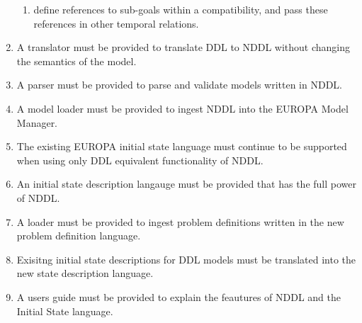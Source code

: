 \documentclass[twoside, 11pt]{article}
\begin{document}
\begin{enumerate}
\begin{enumerate}
\item define references to sub-goals within a compatibility, and pass these references in other temporal relations.
\end{enumerate}
\item A translator must be provided to translate DDL to NDDL without changing the semantics of the model.
\item A parser must be provided to parse and validate models written in NDDL.
\item A model loader must be provided to ingest NDDL into the EUROPA Model Manager.
\item The existing EUROPA initial state language must continue to be supported when using only DDL equivalent functionality of NDDL.
\item An initial state description langauge must be provided that has the full power of NDDL.
\item A loader must be provided to ingest problem definitions written in the new problem definition language.
\item Exisitng initial state descriptions for DDL models must be translated into the new state description language.
\item A users guide must be provided to explain the feautures of NDDL and the Initial State language.
\end{enumerate}
\end{document}
